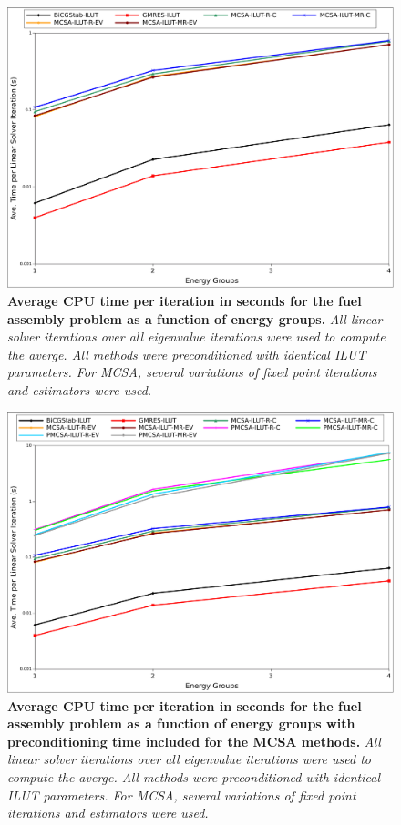 \begin{figure}[t!]
  \begin{center}
    \includegraphics[width=6in]{chapters/spn_equations/solver_time.pdf}
  \end{center}
  \caption{\textbf{Average CPU time per iteration in seconds for the
      fuel assembly problem as a function of energy groups.}
    \textit{All linear solver iterations over all eigenvalue
      iterations were used to compute the averge. All methods were
      preconditioned with identical ILUT parameters. For MCSA, several
      variations of fixed point iterations and estimators were used.}}
  \label{fig:comparison_time}
\end{figure}

\begin{figure}[t!]
  \begin{center}
    \includegraphics[width=6in]{chapters/spn_equations/solver_p_time.pdf}
  \end{center}
  \caption{\textbf{Average CPU time per iteration in seconds for the
      fuel assembly problem as a function of energy groups with
      preconditioning time included for the MCSA methods.}
    \textit{All linear solver iterations over all eigenvalue
      iterations were used to compute the averge. All methods were
      preconditioned with identical ILUT parameters. For MCSA, several
      variations of fixed point iterations and estimators were used.}}
  \label{fig:comparison_prec_time}
\end{figure}
